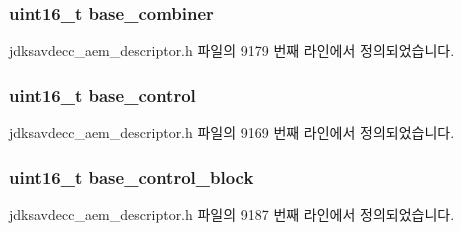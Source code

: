 \subsubsection[{\texorpdfstring{base\+\_\+combiner}{base_combiner}}]{\setlength{\rightskip}{0pt plus 5cm}uint16\+\_\+t base\+\_\+combiner}\hypertarget{structjdksavdecc__descriptor__video__unit_afeae9980c36b3e99f2e4b8ab2c31e9d5}{}\label{structjdksavdecc__descriptor__video__unit_afeae9980c36b3e99f2e4b8ab2c31e9d5}


jdksavdecc\+\_\+aem\+\_\+descriptor.\+h 파일의 9179 번째 라인에서 정의되었습니다.

\subsubsection[{\texorpdfstring{base\+\_\+control}{base_control}}]{\setlength{\rightskip}{0pt plus 5cm}uint16\+\_\+t base\+\_\+control}\hypertarget{structjdksavdecc__descriptor__video__unit_af06eac7dd98377a85258308e8a25e7f2}{}\label{structjdksavdecc__descriptor__video__unit_af06eac7dd98377a85258308e8a25e7f2}


jdksavdecc\+\_\+aem\+\_\+descriptor.\+h 파일의 9169 번째 라인에서 정의되었습니다.

\subsubsection[{\texorpdfstring{base\+\_\+control\+\_\+block}{base_control_block}}]{\setlength{\rightskip}{0pt plus 5cm}uint16\+\_\+t base\+\_\+control\+\_\+block}\hypertarget{structjdksavdecc__descriptor__video__unit_a9303491ec92ba42c28fb904c14d310b0}{}\label{structjdksavdecc__descriptor__video__unit_a9303491ec92ba42c28fb904c14d310b0}


jdksavdecc\+\_\+aem\+\_\+descriptor.\+h 파일의 9187 번째 라인에서 정의되었습니다.

